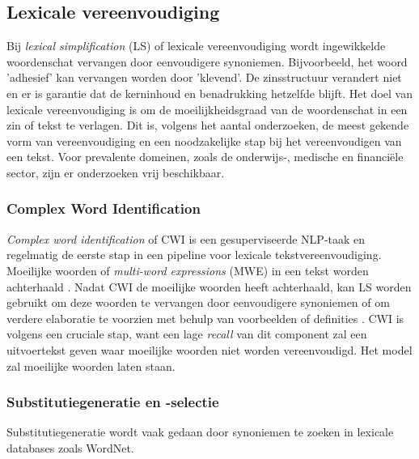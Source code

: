 \subsection{Lexicale vereenvoudiging}

Bij \textit{lexical simplification} (LS) of lexicale vereenvoudiging wordt ingewikkelde woordenschat vervangen door eenvoudigere synoniemen. Bijvoorbeeld, het woord 'adhesief' kan vervangen worden door 'klevend'. De zinsstructuur verandert niet en er is garantie dat de kerninhoud en benadrukking hetzelfde blijft. Het doel van lexicale vereenvoudiging is om de moeilijkheidsgraad van de woordenschat in een zin of tekst te verlagen. Dit is, volgens het aantal onderzoeken, de meest gekende vorm van vereenvoudiging en een noodzakelijke stap bij het vereenvoudigen van een tekst. Voor prevalente domeinen, zoals de onderwijs-, medische en financiële sector, zijn er onderzoeken vrij beschikbaar. 


\subsubsection{Complex Word Identification}

\textit{Complex word identification} of CWI is een gesuperviseerde NLP-taak en regelmatig de eerste stap in een pipeline voor lexicale tekstvereenvoudiging. Moeilijke woorden of \textit{multi-word expressions} (MWE) in een tekst worden achterhaald  \autocite{Shardlow2013, Gooding2019}. Nadat CWI de moeilijke woorden heeft achterhaald, kan LS worden gebruikt om deze woorden te vervangen door eenvoudigere synoniemen of om verdere elaboratie te voorzien met behulp van voorbeelden of definities \autocite{Zeng2005, Kandula2010}. CWI is volgens \textcite{Shardlow2013} een cruciale stap, want een lage \textit{recall} van dit component zal een uitvoertekst geven waar moeilijke woorden niet worden vereenvoudigd. Het model zal moeilijke woorden laten staan.

\subsubsection{Substitutiegeneratie en -selectie}

Substitutiegeneratie wordt vaak gedaan door synoniemen te zoeken in lexicale databases zoals WordNet. 

